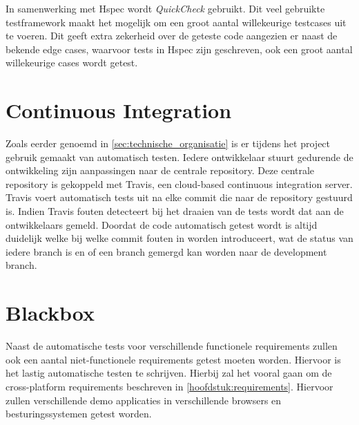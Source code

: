 In samenwerking met Hspec wordt \emph{QuickCheck}\cite{QuickCheck} gebruikt. Dit veel gebruikte testframework maakt het mogelijk om een groot aantal willekeurige testcases uit te voeren. Dit geeft extra zekerheid over de geteste code aangezien er naast de bekende edge cases, waarvoor tests in Hspec zijn geschreven, ook een groot aantal willekeurige cases wordt getest.

\section{Continuous Integration}
Zoals eerder genoemd in \autoref{sec:technische_organisatie} is er tijdens het project gebruik gemaakt van automatisch testen. Iedere ontwikkelaar stuurt gedurende de ontwikkeling zijn aanpassingen naar de centrale repository. Deze centrale repository is gekoppeld met Travis, een cloud-based continuous integration server. Travis voert automatisch tests uit na elke commit die naar de repository gestuurd is. Indien Travis fouten detecteert bij het draaien van de tests wordt dat aan de ontwikkelaars gemeld. Doordat de code automatisch getest wordt is altijd duidelijk welke bij welke commit fouten in worden introduceert, wat de status van iedere branch is en of een branch gemergd kan worden naar de development branch.

\section{Blackbox}
Naast de automatische tests voor verschillende functionele requirements zullen ook een aantal niet-functionele requirements getest moeten worden. Hiervoor is het lastig automatische testen te schrijven. Hierbij zal het vooral gaan om de cross-platform requirements beschreven in \autoref{hoofdstuk:requirements}. Hiervoor zullen verschillende demo applicaties in verschillende browsers en besturingssystemen getest worden.
